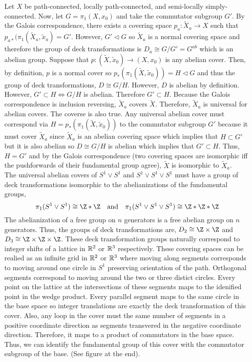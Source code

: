 \documentclass[12pt]{extarticle}
\begin{document}
Let $X$ be path-connected, locally path-connected, and semi-locally simply-connected. Now, let $G = \pi_1(X, x_0)$ and take the commutator subgroup $G'$. By the Galois correspondence, there exists a covering space $p_a : \tilde{X}_a \to X$ such that $p_{a*}(\pi_1(\tilde{X}_a, \tilde{x}_a) = G'$. However, $G' \triangleleft G$ so $\tilde{X}_a$ is a normal covering space and therefore the group of deck transformations is $D_a \cong G/G' = G^{ab}$ which is an abelian group. Suppose that $p : (\tilde{X}, \tilde{x}_0) \to (X, x_0)$ is any abelian cover. Then, by definition, $p$ is a normal cover so $p_*(\pi_1(\tilde{X}, \tilde{x}_0)) = H \triangleleft G$ and thus the group of deck transformations, $D \cong G/H$. However, $D$ is abelian by definition. However, $G' \subset H \iff G/H$ is abelian. Therefore $G' \subset H$. Because the Galois correspondence is inclusion reversing, $\tilde{X}_a$ covers $\tilde{X}$. Therefore, $\tilde{X}_a$ is universal for abelian covers. The coverse is also true. Any universal abelian cover must correspond via $H = p_*(\pi_1(\tilde{X}, \tilde{x}_0))$ to the commutator subgroup $G'$ because it must cover $\tilde{X}_a$ since $\tilde{X}_a$ is an abelian covering space which implies that $H \subset G'$ but it is also abelian so $D \cong G/H$ is abelian which implies that $G' \subset H$. Thus, $H = G'$ and by the Galois correspondence (two covering spaces are isomorphic iff the pushforwards of their fundamental group agree), $\tilde{X}$ is isomorphic to $\tilde{X}_a$.  \bigskip \\
The universal abelian covers of $S^1 \vee S^1$ and $S^1 \vee S^1 \vee S^1$ must have a group of deck transformations isomorphic to the abelianizations of the fundamental groups,
\[\pi_1(S^1 \vee S^1) \cong \Z * \Z \quad \text{and} \quad \pi_1(S^1 \vee S^1 \vee S^1) \cong \Z * \Z * \Z\]
The abelianization of a free group on $n$ generators is a free abelian group on $n$ generators. Thus, the groups of deck transformations are, $D_2 \cong \Z \times \Z$ and $D_3 \cong \Z \times \Z \times \Z$. These deck transformation groups naturally correspond to integer shifts of a lattice in $\mathbb{R}^2$ or $\mathbb{R}^3$ respectively. These covering spaces can be realied as an infinite grid in $\mathbb{R}^2$ or $\mathbb{R}^3$ where moving along segments corresponds to moving around one circle in $S^1$ preserving orientation of the path. Orthogonal segments correspond to moving around the two or three distict circles. Every point on the lattice at the intersections of these segments maps to the idenified point in the wedge product. Every parallel segment maps to the same circle in the base space so integer translations are exactly the deck transformation of this cover. Also, any loop in the cover must the same number of segments in a positive coordinate direction as segments transvered in the negative coordinate direction. Therefore, it maps to a product of commutators in the base space. Thus, we can identify the fundamental group of this cover with the commutator subgroup of the base. (See figure at the end).      
\end{document}
